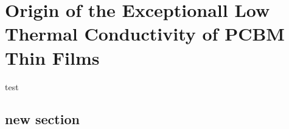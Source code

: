 \chapter{Origin of the Exceptionall Low Thermal Conductivity of PCBM Thin Films}

test

\section{\label{pcbm:Introduction}new section}


